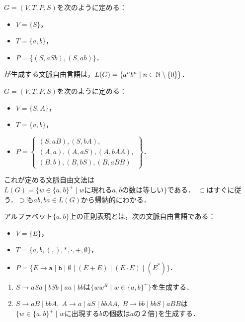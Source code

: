 \documentclass[uplatex, dvipdfmx]{jsreport}
\begin{document}
\begin{example}
        $G=(V,T,P,S)$を次のように定める：
        \begin{itemize}
            \item $V=\{S\}$，
            \item $T=\{a,b\}$，
            \item $P=\{(S,aSb),(S,ab)\}$．
        \end{itemize}
    が生成する文脈自由言語は，$L(G)=\{a^nb^n\mid n\in\mathbb{N}\setminus\{0\}\}$．
\end{example}

\begin{example}
    $G=(V,T,P,S)$を次のように定める：
        \begin{itemize}
            \item $V=\{S,A\}$，
            \item $T=\{a,b\}$，
            \item $P=\left\{\begin{array}{l}
                (S,aB),(S,bA),\\
                (A,a),(A,aS),(A,bAA),\\
                (B,b),(B,bS),(B,aBB)
            \end{array}\right\}$．
        \end{itemize}
    これが定める文脈自由文法は$L(G)=\{w\in\{a,b\}^+\mid wに現れるa,bの数は等しい\}$である．
    $\subset$はすぐに従う．$\supset$も$ab,ba\in L(G)$から帰納的にわかる．
\end{example}

\begin{example}[正則表現]
    アルファベット$\{a,b\}$上の正則表現とは，次の文脈自由言語である：
    \begin{itemize}
        \item $V=\{E\}$，
        \item $T=\{a,b,(,),*,\cdot,+,\emptyset\}$，
        \item $P=\{E\rightarrow\mathtt{a}\mid\mathtt{b}\mid\emptyset\mid(E+E)\mid(E\cdot E)\mid(E^*)\}$．
    \end{itemize}
\end{example}

\begin{example}\mbox{}
    \begin{enumerate}
        \item $S\rightarrow aSa\mid bSb\mid aa\mid bb$は$\{ww^R\mid w\in\{a,b\}^+\}$を生成する．
        \item $S\rightarrow aB\mid bbA,\;A\rightarrow a\mid aS\mid bbAA,\;B\rightarrow bb\mid bbS\mid aBB$は$\{w\in\{a,b\}^+\mid wに出現するbの個数はaの２倍\}$を生成する．
    \end{enumerate}
\end{example}
\end{document}
